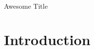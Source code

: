\documentclass[12pt, a4paper]{article}
\begin{document}
\begin{center}
Awesome Title
\end{center}

\section{Introduction}
\end{document}
